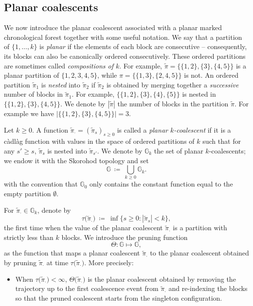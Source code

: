 \begin{refsegment}
\subsection{Planar  coalescents}
\label{Ch4:sec:model_formal}


We now introduce the planar coalescent  associated with a planar marked chronological forest together with some useful notation.
We say that a partition of $\{1,\ldots,k\}$ is \emph{planar} if the elements of each block are consecutive -- consequently, its blocks can also be canonically ordered consecutively. These ordered partitions are sometimes called \emph{compositions of $k$}. For example, $\tilde \pi=\{\{1,2\},\{3\},\{4,5\}\}$ is a planar partition of $\{1,2,3,4,5\}$, while $\pi=\{\{1,3\},\{2,4,5\}\}$ is not. An ordered partition $\tilde \pi_1$ is \emph{nested} into $\tilde \pi_2$ if $\tilde \pi_{2}$ is obtained by merging together a \emph{successive} number of blocks in $\tilde \pi_1$. For example, $\{\{1,2\},\{3\},\{4\} ,\{5\}\}$ is nested in $\{\{1,2\},\{3\},\{4,5\}\}$. We denote by $|\tilde\pi|$ the number of blocks in the partition $\tilde \pi$. For example we have $\big|\{\{1,2\},\{3\},\{4,5\}\}\big|=3$.

Let $k\geq 0$. A function $\tilde{\pi}_\cdot = (\tilde \pi_s)_{s\geq0}$ is called a \emph{planar $k$-coalescent}  if it is a càdlàg function with values in the space of ordered partitions of $k$ such that for any $s'\geq s$, $\tilde \pi_{s}$ is nested into $\tilde \pi_{s'}$. 
We denote by $\mathbb{G}_{k}$  the set of planar $k$-coalescents; we endow it with the Skorohod topology and set
\[
\mathbb{G}\ \coloneqq\ \bigcup_{k\geq 0}\mathbb{G}_{k}.
\]
with the convention that $\mathbb{G}_0$ only contains the constant function equal to the empty partition $\emptyset$.

For $\tilde \pi_{\cdot}\in\mathbb{G}_k$, denote by
\[
\tau\big(\tilde \pi_{\cdot}\big)\ \coloneqq \ \inf \big\{ s \ge 0 : |\tilde\pi_s|< k\big\},
\]
 the first time when the value of the planar coalescent $\tilde\pi_{\cdot}$ is a partition with strictly less than $k$ blocks. We introduce the pruning function
\[ \Theta:\mathbb{G}\longmapsto \mathbb{G},\]
as the function that maps a planar coalescent $\tilde\pi_{\cdot}$ to the planar coalescent obtained by pruning $\tilde \pi_{\cdot}$ at time $\tau\big(\tilde \pi_{\cdot}\big)$. More precisely:
\begin{itemize}
  \item When $\tau\big(\tilde \pi_{\cdot}\big)<\infty$, $\Theta\big(\tilde \pi_{\cdot}\big)$ is the planar coalescent obtained by removing the trajectory up to the first coalescence event from $\tilde \pi_{\cdot}$ and re-indexing the blocks so that the pruned coalescent starts from the singleton configuration. 
  

\end{itemize}
\end{refsegment}
